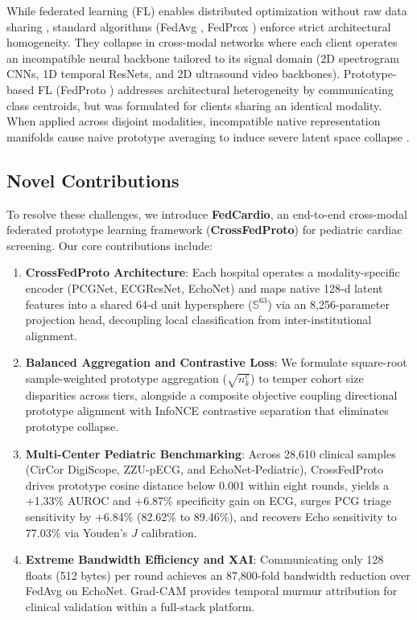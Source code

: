 \documentclass[conference]{IEEEtran}
\begin{document}
While federated learning (FL) enables distributed optimization without raw data sharing \cite{mcmahan2017communication}, standard algorithms (FedAvg \cite{mcmahan2017communication}, FedProx \cite{li2020federated}) enforce strict architectural homogeneity. They collapse in cross-modal networks where each client operates an incompatible neural backbone tailored to its signal domain (2D spectrogram CNNs, 1D temporal ResNets, and 2D ultrasound video backbones). Prototype-based FL (FedProto \cite{tan2022fedproto}) addresses architectural heterogeneity by communicating class centroids, but was formulated for clients sharing an identical modality. When applied across disjoint modalities, incompatible native representation manifolds cause naive prototype averaging to induce severe latent space collapse \cite{le2024multimodal}.

\subsection{Novel Contributions}
To resolve these challenges, we introduce \textbf{FedCardio}, an end-to-end cross-modal federated prototype learning framework (\textbf{CrossFedProto}) for pediatric cardiac screening. Our core contributions include:
\begin{enumerate}
    \item \textbf{CrossFedProto Architecture}: Each hospital operates a modality-specific encoder (PCGNet, ECGResNet, EchoNet) and maps native 128-d latent features into a shared 64-d unit hypersphere ($\mathbb{S}^{63}$) via an 8,256-parameter projection head, decoupling local classification from inter-institutional alignment.
    \item \textbf{Balanced Aggregation and Contrastive Loss}: We formulate square-root sample-weighted prototype aggregation ($\sqrt{n_k^c}$) to temper cohort size disparities across tiers, alongside a composite objective coupling directional prototype alignment with InfoNCE contrastive separation that eliminates prototype collapse.
    \item \textbf{Multi-Center Pediatric Benchmarking}: Across 28,610 clinical samples (CirCor DigiScope, ZZU-pECG, and EchoNet-Pediatric), CrossFedProto drives prototype cosine distance below 0.001 within eight rounds, yields a +1.33\% AUROC and +6.87\% specificity gain on ECG, surges PCG triage sensitivity by +6.84\% (82.62\% to 89.46\%), and recovers Echo sensitivity to 77.03\% via Youden's $J$ calibration.
    \item \textbf{Extreme Bandwidth Efficiency and XAI}: Communicating only 128 floats (512 bytes) per round achieves an 87,800-fold bandwidth reduction over FedAvg on EchoNet. Grad-CAM provides temporal murmur attribution for clinical validation within a full-stack platform.
\end{enumerate}
\end{document}
